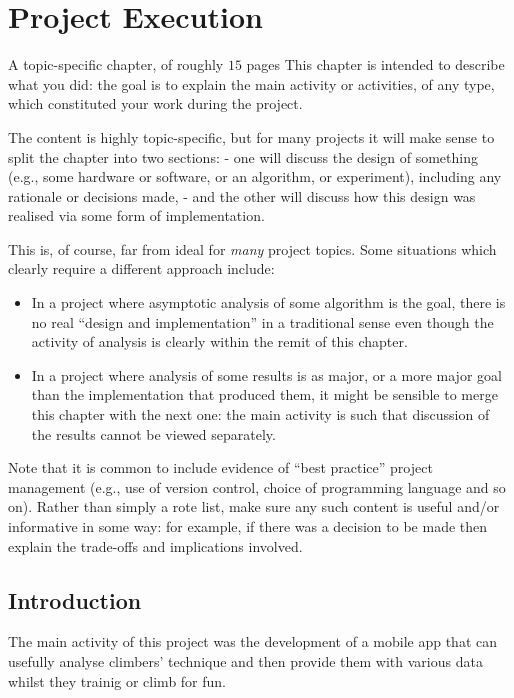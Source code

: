 \chapter{Project Execution}
\label{chap:execution}

A topic-specific chapter, of roughly $15$ pages
This chapter is intended to describe what you did: the goal is to explain the main activity or activities, of any type, which constituted your work during the project.

The content is highly topic-specific, but for many projects it will make sense to split the chapter into two sections:
 - one will discuss the design of something (e.g., some hardware or software, or an algorithm, or experiment), including any rationale or decisions made,
 - and the other will discuss how this design was realised via some form of implementation.

This is, of course, far from ideal for {\em many} project topics.  Some
situations which clearly require a different approach include:
\begin{itemize}
\item In a project where asymptotic analysis of some algorithm is the goal,
      there is no real ``design and implementation'' in a traditional sense
      even though the activity of analysis is clearly within the remit of
      this chapter.
\item In a project where analysis of some results is as major, or a more
      major goal than the implementation that produced them, it might be
      sensible to merge this chapter with the next one: the main activity
      is such that discussion of the results cannot be viewed separately.
\end{itemize}


Note that it is common to include evidence of ``best practice'' project management (e.g., use of version control, choice of programming language and so on).
Rather than simply a rote list, make sure any such content is useful and/or informative in some way: for example, if there was a decision to be made then explain the trade-offs and implications involved.



\section{Introduction}
The main activity of this project was the development of a mobile app that can usefully analyse climbers' technique and then provide them with various data whilst they trainig or climb for fun.


